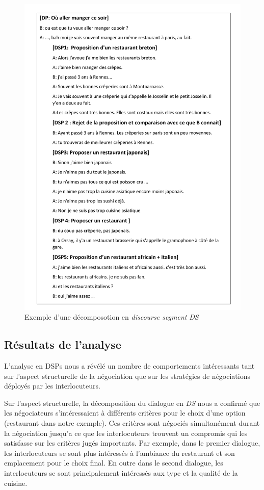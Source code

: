 			
			\begin{figure}
				\includegraphics[width=5in]{Figures/dsp_analysis.pdf}
				\caption{\label{fig:conc} Exemple d'une décomposotion en \emph{discourse segment} \emph{DS}}
			\end{figure} 
			 
		\subsection{Résultats de l'analyse}
			L'analyse en DSPs nous a révélé un nombre de comportements intéressants tant sur l'aspect structurelle de la négociation que sur les stratégies de négociations déployés par les interlocuteurs. 	
			
			Sur l'aspect structurelle, la décomposition du dialogue en \emph{DS} nous a confirmé que les négociateurs s'intéressaient à différents critères pour le choix d'une option (restaurant dans notre exemple). Ces critères sont négociés simultanément durant la négociation jusqu'a ce que les interlocuteurs trouvent un compromis qui les satisfasse sur les critères jugés importants. 
			Par exemple, dans le premier dialogue, les interlocuteurs se sont plus intéressés à l'ambiance du restaurant et son emplacement pour le choix final. En outre dans le second dialogue, les interlocuteurs se sont principalement intéressés aux type et la qualité de la cuisine.
			    
